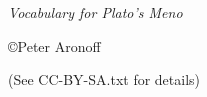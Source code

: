 \begin{titlepage}

\begin{center}

\huge \textit{Vocabulary for Plato's \textit{Meno}}

\vskip2in

\large \copyright Peter Aronoff \the\year

(See CC-BY-SA.txt for details)

\newpage

\end{center}

\end{titlepage}
